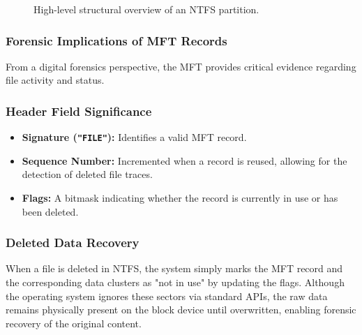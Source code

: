 \begin{figure}[H]
\centering
{}
\caption{High-level structural overview of an NTFS partition.}
\end{figure}

\subsubsection{Forensic Implications of MFT Records}
From a digital forensics perspective, the MFT provides critical evidence regarding file activity and status. 

\subsubsection*{Header Field Significance}
\begin{itemize}
    \item \textbf{Signature (\texttt{"FILE"}):} Identifies a valid MFT record.
    \item \textbf{Sequence Number:} Incremented when a record is reused, allowing for the detection of deleted file traces.
    \item \textbf{Flags:} A bitmask indicating whether the record is currently in use or has been deleted.
\end{itemize}

\subsubsection*{Deleted Data Recovery}
When a file is deleted in NTFS, the system simply marks the MFT record and the corresponding data clusters as "not in use" by updating the flags. Although the operating system ignores these sectors via standard APIs, the raw data remains physically present on the block device until overwritten, enabling forensic recovery of the original content.


